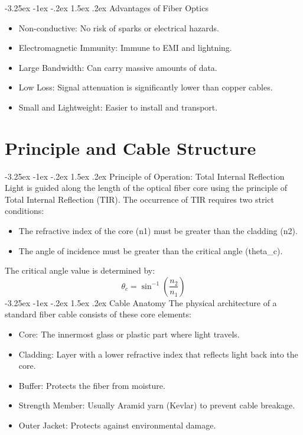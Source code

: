 \documentclass[11pt,a4paper]{report}
\makeatletter
\renewcommand{\section}{\@startsection{section}{1}{\z@}%
  {-3.25ex \@plus -1ex \@minus -.2ex}%
  {1.5ex \@plus.2ex}%
  {\normalfont\Large\bfseries\color{primaryColor}}}
\makeatother
\begin{document}
\section{Advantages of Fiber Optics}
\begin{itemize}
  \item Non-conductive: No risk of sparks or electrical hazards.
  \item Electromagnetic Immunity: Immune to EMI and lightning.
  \item Large Bandwidth: Can carry massive amounts of data.
  \item Low Loss: Signal attenuation is significantly lower than copper cables.
  \item Small and Lightweight: Easier to install and transport.
\end{itemize}
\chapter{Principle and Cable Structure}
\section{Principle of Operation: Total Internal Reflection}
Light is guided along the length of the optical fiber core using the principle of Total Internal Reflection (TIR). The occurrence of TIR requires two strict conditions:
\begin{itemize}
  \item The refractive index of the core (n1) must be greater than the cladding (n2).
  \item The angle of incidence must be greater than the critical angle (theta\_c).
\end{itemize}
The critical angle value is determined by:
\begin{equation}\theta_c = \sin^{-1}\left( \frac{n_2}{n_1} \right)\end{equation}
\section{Cable Anatomy}
The physical architecture of a standard fiber cable consists of these core elements:
\begin{itemize}
  \item Core: The innermost glass or plastic part where light travels.
  \item Cladding: Layer with a lower refractive index that reflects light back into the core.
  \item Buffer: Protects the fiber from moisture.
  \item Strength Member: Usually Aramid yarn (Kevlar) to prevent cable breakage.
  \item Outer Jacket: Protects against environmental damage.
\end{itemize}
\end{document}
